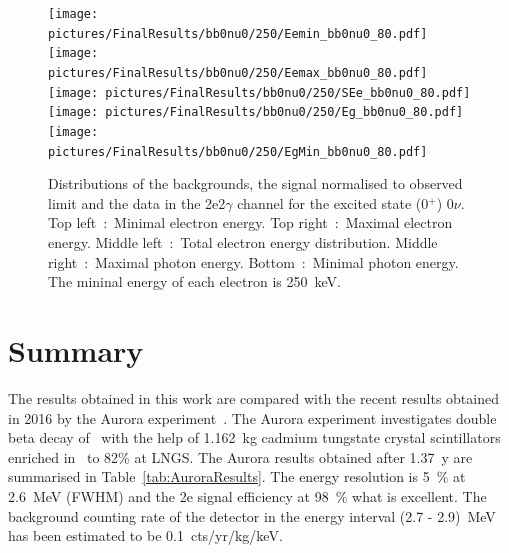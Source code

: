 \documentclass[main.tex]{subfiles}
\begin{document}
\begin{figure} [h!]
\begin{center}
\texttt{[image: pictures/FinalResults/bb0nu0/250/Eemin\_bb0nu0\_80.pdf]}
\texttt{[image: pictures/FinalResults/bb0nu0/250/Eemax\_bb0nu0\_80.pdf]}
\texttt{[image: pictures/FinalResults/bb0nu0/250/SEe\_bb0nu0\_80.pdf]}
\texttt{[image: pictures/FinalResults/bb0nu0/250/Eg\_bb0nu0\_80.pdf]}
\texttt{[image: pictures/FinalResults/bb0nu0/250/EgMin\_bb0nu0\_80.pdf]}
\end{center}
\caption{Distributions of the backgrounds, the signal normalised to observed limit and the data in the 2e2$\gamma$ channel for the excited state (0$^+$) 0$\nu$. Top left~:~Minimal electron energy. Top right~:~Maximal electron energy. Middle left~:~Total electron energy distribution. Middle right~:~Maximal photon energy. Bottom~:~Minimal photon energy. The mininal energy of each electron is 250~keV.}
\label{plot:EeminAndEemax250bb0nu0}
\end{figure}




\FloatBarrier


\section{Summary}\label{sec:SummaryAnalysis}


\NI The results obtained in this work are compared with the recent results obtained in 2016 by the Aurora experiment~\cite{Aurora}. The Aurora experiment investigates double beta decay of \Cd ~with the help of 1.162~kg cadmium tungstate crystal scintillators enriched in \Cd ~to 82\% at LNGS. The Aurora results obtained after 1.37~y are summarised in Table~\ref{tab:AuroraResults}. The energy resolution is 5~\% at 2.6~MeV (FWHM) and the 2e signal efficiency at 98~\% what is excellent. The background counting rate of the detector in the energy interval (2.7 - 2.9)~MeV has been estimated to be 0.1~cts/yr/kg/keV.
\end{document}
